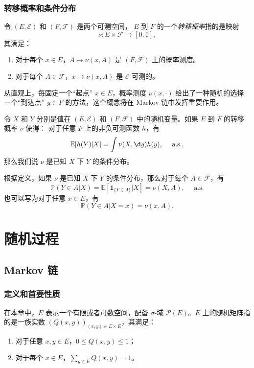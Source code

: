 \documentclass[fontset=none]{Notes}
\newcommand{\indicator}[1]{\mathbold 1_{#1}}
\newcommand{\alsu}[1]{\text{$#1$ a.s.}}
\begin{document}
\section{转移概率和条件分布}

\begin{definition}
  令 $(E,\mathcal{E})$ 和 $(F,\mathcal{F})$ 是两个可测空间，
  $E$ 到 $F$ 的一个\emph{转移概率}指的是映射
  \[
    \nu:E\times \mathcal{F}\to [0,1],  
  \]
  其满足：
  \begin{enumerate}
    \item 对于每个 $x\in E$，$A\mapsto \nu(x,A)$ 是
    $(F,\mathcal{F})$ 上的概率测度。
    \item 对于每个 $A\in \mathcal{F}$，$x\mapsto \nu(x,A)$
    是 $\mathcal{E}$-可测的。
  \end{enumerate}
\end{definition}

从直观上，每固定一个“起点” $x\in E$，概率测度 $\nu(x,\cdot)$
给出了一种随机的选择一个“到达点” $y\in F$ 的方法，这个概念将在
Markov 链中发挥重要作用。

\begin{definition}
  令 $X$ 和 $Y$ 分别是值在 $(E,\mathcal{E})$ 和 $(F,\mathcal{F})$
  中的随机变量。如果 $E$ 到 $F$ 的转移概率 $\nu$ 使得：
  对于任意 $F$ 上的非负可测函数 $h$，有
  \[
    \mathbb{E}[h(Y)|X]=\int\nu(X,\d y) h(y),\quad 
    \alsu{},  
  \]
  那么我们说 $\nu$ 是已知 $X$ 下 $Y$ 的条件分布。
\end{definition}

根据定义，如果 $\nu$ 是已知 $X$ 下 $Y$ 的条件分布，那么对于每个
$A\in \mathcal{F}$，有
\[
  \mathbb{P}(Y\in A|X)=\mathbb{E}[\indicator{\{Y\in A\}}|X]
  =\nu(X,A),\quad \alsu{}
\]
也可以写为对于任意 $x\in E$，有
\[
  \mathbb{P}(Y\in A| X=x)=\nu(x,A).  
\]

\part{随机过程}

\chapter{Markov 链}

\section{定义和首要性质}

在本章中，$E$ 表示一个有限或者可数空间，配备 $\sigma$-域
$\mathcal{P}(E)$。$E$ 上的随机矩阵指的是一族实数 
$(Q(x,y))_{(x,y)\in E\times E}$，其满足：
\begin{enumerate}
  \item 对于任意 $x,y\in E$，$0\leq Q(x,y)\leq 1$；
  \item 对于每个 $x\in E$，$\sum_{y\in E}Q(x,y)=1$。
\end{enumerate}
\end{document}
